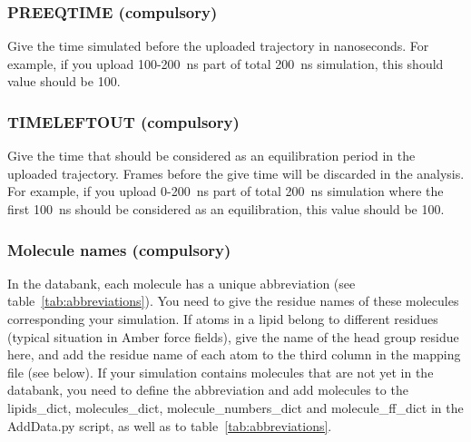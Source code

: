 \documentclass[fleqn,10pt]{wlscirep}
\begin{document}
\subsubsection*{PREEQTIME (compulsory)}
Give the time simulated before the uploaded trajectory in nanoseconds. For example, if you upload 100-200~ns part of total 200~ns simulation, this should value should be 100.

\subsubsection*{TIMELEFTOUT (compulsory)}
Give the time that should be considered as an equilibration period in the uploaded trajectory. Frames before the give time will be discarded in the analysis. For example, if you upload 0-200~ns part of total 200~ns simulation where the first 100~ns should be considered as an equilibration, this value should be 100.


\subsubsection*{Molecule names (compulsory)}
In the databank, each molecule has a unique abbreviation (see table~\ref{tab:abbreviations}). 
You need to give the residue names of these molecules corresponding your simulation.
If atoms in a lipid belong to different residues (typical situation in Amber force fields), give the name of the head group residue here, and add the residue name of each atom to the third column in the mapping file (see below). If your simulation contains molecules that are not yet in the databank, you need to define the abbreviation and add molecules to the lipids\_dict, molecules\_dict, molecule\_numbers\_dict and molecule\_ff\_dict in the AddData.py script, as well as to table~\ref{tab:abbreviations}. 
\end{document}
